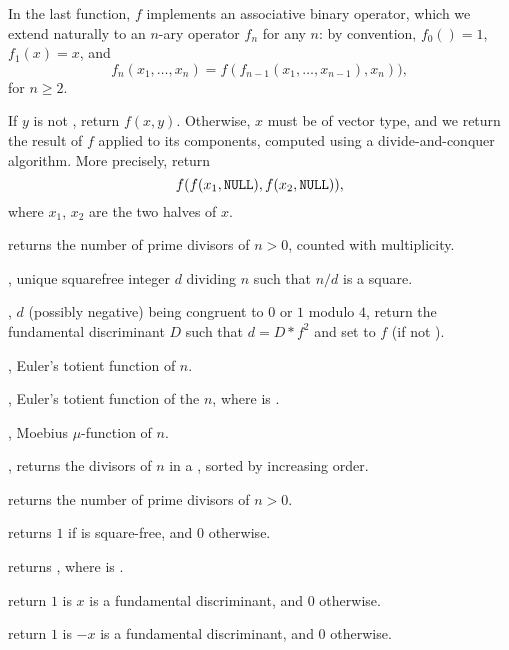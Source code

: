 
In the last function, $f$ implements an associative binary operator, which we
extend naturally to an $n$-ary operator $f_n$ for any $n$: by convention,
$f_0() = 1$, $f_1(x) = x$, and
$$ f_n(x_1,\dots,x_n) = f( f_{n-1}(x_1,\dots,x_{n-1}), x_n)),$$
for $n \geq 2$.

 If $y$ is not
, return $f(x,y)$. Otherwise, $x$ must be of vector type, and we
return the result of $f$ applied to its components, computed using a
divide-and-conquer algorithm. More precisely, return
$$f( f(x_1,{\tt NULL}), f(x_2,{\tt NULL}) ),$$
where $x_1$, $x_2$ are the two halves of $x$.


 returns the number of prime divisors of $n >
0$, counted with multiplicity.

, unique squarefree integer $d$ dividing $n$ such
that $n/d$ is a square.

, $d$ (possibly negative)
being congruent to $0$ or $1$ modulo $4$, return the fundamental
discriminant $D$ such that $d=D*f^2$ and set  to $f$
(if  not ).

, Euler's totient function of $n$.

, Euler's totient function of the
 $n$, where  is .

, Moebius $\mu$-function of $n$.

, returns the divisors of $n$ in a
, sorted by increasing order.

 returns the number of prime divisors of $n > 0$.

 returns $1$ if 
is square-free, and $0$ otherwise.

 returns , where
 is .

 return $1$ is $x$ is a fundamental
discriminant, and $0$ otherwise.

 return $1$ is $-x$ is a fundamental
discriminant, and $0$ otherwise.

